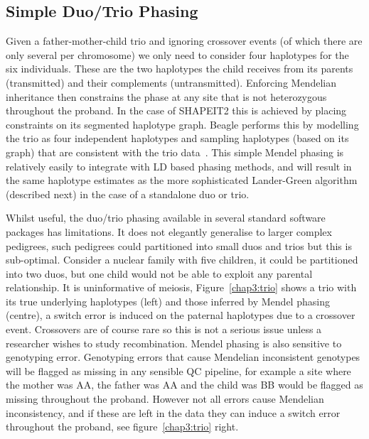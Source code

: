 \subsection{Simple Duo/Trio Phasing}
Given a father-mother-child trio and ignoring crossover events (of which there are only several per chromosome) we only need to consider four haplotypes for the six individuals.  These are the two haplotypes the child receives from its parents (transmitted) and their complements (untransmitted).  Enforcing Mendelian inheritance then constrains the phase at any site that is not heterozygous throughout the proband. In the case of SHAPEIT2 this is achieved by placing constraints on its segmented haplotype graph. Beagle performs this by modelling the trio as four independent haplotypes and sampling haplotypes (based on its graph) that are consistent with the trio data~\citep{browning2009unified}. This simple Mendel phasing is relatively easily to integrate with LD based phasing methods, and will result in the same haplotype estimates as the more sophisticated Lander-Green algorithm (described next) in the case of a standalone duo or trio.  

Whilst useful, the duo/trio phasing available in several standard software packages has limitations. It does not elegantly generalise to larger complex pedigrees, such pedigrees could partitioned into small duos and trios but this is sub-optimal.  Consider a nuclear family with five children, it could be partitioned into two duos, but one child would not be able to exploit any parental relationship.  It is uninformative of meiosis, Figure~\ref{chap3:trio} shows a trio with its true underlying haplotypes (left) and those inferred by Mendel phasing (centre), a switch error is induced on the paternal haplotypes due to a crossover event. Crossovers are of course rare so this is not a serious issue unless a researcher wishes to study recombination.  Mendel phasing is also sensitive to genotyping error.  Genotyping errors that cause Mendelian inconsistent genotypes will be flagged as missing in any sensible QC pipeline, for example a site where the mother was AA, the father was AA and the child was BB would be flagged as missing throughout the proband.  However not all errors cause Mendelian inconsistency, and if these are left in the data they can induce a switch error throughout the proband, see figure~\ref{chap3:trio} right.  

